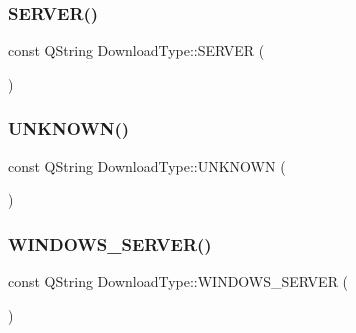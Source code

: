 \subsubsection{\texorpdfstring{S\+E\+R\+V\+E\+R()}{SERVER()}}
{\footnotesize\ttfamily const Q\+String Download\+Type\+::\+S\+E\+R\+V\+ER (\begin{DoxyParamCaption}\item[{\char`\"{}server\char`\"{}}]{ }\end{DoxyParamCaption})}

\mbox{\label{namespace_download_type_af0b7e3166d9097f4d852921ee9d451c3}} 
\subsubsection{\texorpdfstring{U\+N\+K\+N\+O\+W\+N()}{UNKNOWN()}}
{\footnotesize\ttfamily const Q\+String Download\+Type\+::\+U\+N\+K\+N\+O\+WN (\begin{DoxyParamCaption}\item[{\char`\"{}unknown\char`\"{}}]{ }\end{DoxyParamCaption})}

\mbox{\label{namespace_download_type_ae5f0852515c83e221c3668568b550472}} 
\subsubsection{\texorpdfstring{W\+I\+N\+D\+O\+W\+S\+\_\+\+S\+E\+R\+V\+E\+R()}{WINDOWS\_SERVER()}}
{\footnotesize\ttfamily const Q\+String Download\+Type\+::\+W\+I\+N\+D\+O\+W\+S\+\_\+\+S\+E\+R\+V\+ER (\begin{DoxyParamCaption}\item[{\char`\"{}windows\+\_\+server\char`\"{}}]{ }\end{DoxyParamCaption})}

